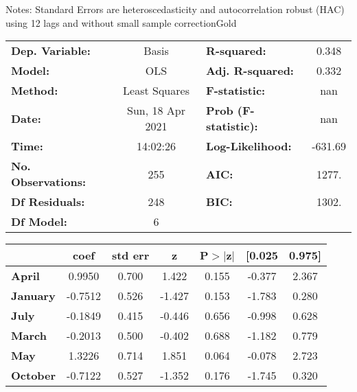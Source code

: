 Notes: \newline
 [1] Standard Errors are heteroscedasticity and autocorrelation robust (HAC) using 12 lags and without small sample correctionGold\begin{center}
\begin{tabular}{lclc}
\toprule
\textbf{Dep. Variable:}    &      Basis       & \textbf{  R-squared:         } &     0.348   \\
\textbf{Model:}            &       OLS        & \textbf{  Adj. R-squared:    } &     0.332   \\
\textbf{Method:}           &  Least Squares   & \textbf{  F-statistic:       } &       nan   \\
\textbf{Date:}             & Sun, 18 Apr 2021 & \textbf{  Prob (F-statistic):} &      nan    \\
\textbf{Time:}             &     14:02:26     & \textbf{  Log-Likelihood:    } &   -631.69   \\
\textbf{No. Observations:} &         255      & \textbf{  AIC:               } &     1277.   \\
\textbf{Df Residuals:}     &         248      & \textbf{  BIC:               } &     1302.   \\
\textbf{Df Model:}         &           6      & \textbf{                     } &             \\
\bottomrule
\end{tabular}
\begin{tabular}{lcccccc}
                 & \textbf{coef} & \textbf{std err} & \textbf{z} & \textbf{P$> |$z$|$} & \textbf{[0.025} & \textbf{0.975]}  \\
\midrule
\textbf{April}   &       0.9950  &        0.700     &     1.422  &         0.155        &       -0.377    &        2.367     \\
\textbf{January} &      -0.7512  &        0.526     &    -1.427  &         0.153        &       -1.783    &        0.280     \\
\textbf{July}    &      -0.1849  &        0.415     &    -0.446  &         0.656        &       -0.998    &        0.628     \\
\textbf{March}   &      -0.2013  &        0.500     &    -0.402  &         0.688        &       -1.182    &        0.779     \\
\textbf{May}     &       1.3226  &        0.714     &     1.851  &         0.064        &       -0.078    &        2.723     \\
\textbf{October} &      -0.7122  &        0.527     &    -1.352  &         0.176        &       -1.745    &        0.320     \\

\end{tabular}
\end{center}
